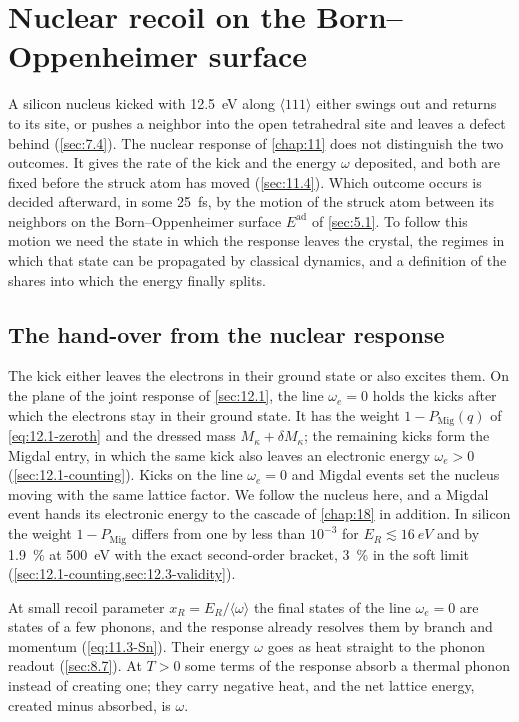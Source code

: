 \section{Nuclear recoil on the Born--Oppenheimer surface}\label{sec:19.1}

A silicon nucleus kicked with \SI{12.5}{eV} along $\langle111\rangle$ either swings out and returns to its site, or pushes a neighbor into the open tetrahedral site and leaves a defect behind (\cref{sec:7.4}). The nuclear response of \cref{chap:11} does not distinguish the two outcomes. It gives the rate of the kick and the energy $\omega$ deposited, and both are fixed before the struck atom has moved (\cref{sec:11.4}). Which outcome occurs is decided afterward, in some \SI{25}{fs}, by the motion of the struck atom between its neighbors on the Born--Oppenheimer surface $E^{\mathrm{ad}}$ of \cref{sec:5.1}. To follow this motion we need the state in which the response leaves the crystal, the regimes in which that state can be propagated by classical dynamics, and a definition of the shares into which the energy finally splits.

\subsection{The hand-over from the nuclear response}\label{sec:19.1-handover}

The kick either leaves the electrons in their ground state or also excites them. On the plane of the joint response of \cref{sec:12.1}, the line $\omega_e = 0$ holds the kicks after which the electrons stay in their ground state. It has the weight $1 - P_{\mathrm{Mig}}(q)$ of \cref{eq:12.1-zeroth} and the dressed mass $M_\kappa + \delta M_\kappa$; the remaining kicks form the Migdal entry, in which the same kick also leaves an electronic energy $\omega_e > 0$ (\cref{sec:12.1-counting}). Kicks on the line $\omega_e = 0$ and Migdal events set the nucleus moving with the same lattice factor. We follow the nucleus here, and a Migdal event hands its electronic energy to the cascade of \cref{chap:18} in addition. In silicon the weight $1 - P_{\mathrm{Mig}}$ differs from one by less than $10^{-3}$ for $E_R \lesssim \SI{16}{eV}$ and by \SI{1.9}{\percent} at \SI{500}{eV} with the exact second-order bracket, \SI{3}{\percent} in the soft limit (\cref{sec:12.1-counting,sec:12.3-validity}).

At small recoil parameter $x_R = E_R/\langle\omega\rangle$ the final states of the line $\omega_e = 0$ are states of a few phonons, and the response already resolves them by branch and momentum (\cref{eq:11.3-Sn}). Their energy $\omega$ goes as heat straight to the phonon readout (\cref{sec:8.7}). At $T > 0$ some terms of the response absorb a thermal phonon instead of creating one; they carry negative heat, and the net lattice energy, created minus absorbed, is $\omega$.

